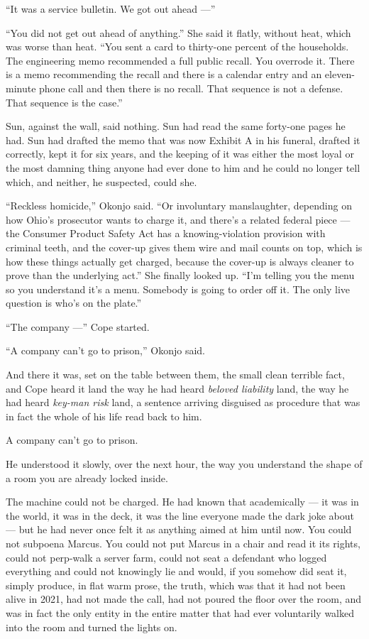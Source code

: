 \documentclass[11pt,openany]{book}
\newcommand{\scenebreak}{\par\vspace{0.5\baselineskip}\begin{center}\textasteriskcentered\quad\textasteriskcentered\quad\textasteriskcentered\end{center}\vspace{0.5\baselineskip}\par}
\begin{document}
``It was a service bulletin. We got out ahead ---''

``You did not get out ahead of anything.'' She said it flatly, without heat, which was worse than heat. ``You sent a card to thirty-one percent of the households. The engineering memo recommended a full public recall. You overrode it. There is a memo recommending the recall and there is a calendar entry and an eleven-minute phone call and then there is no recall. That sequence is not a defense. That sequence is the case.''

Sun, against the wall, said nothing. Sun had read the same forty-one pages he had. Sun had drafted the memo that was now Exhibit A in his funeral, drafted it correctly, kept it for six years, and the keeping of it was either the most loyal or the most damning thing anyone had ever done to him and he could no longer tell which, and neither, he suspected, could she.

``Reckless homicide,'' Okonjo said. ``Or involuntary manslaughter, depending on how Ohio's prosecutor wants to charge it, and there's a related federal piece --- the Consumer Product Safety Act has a knowing-violation provision with criminal teeth, and the cover-up gives them wire and mail counts on top, which is how these things actually get charged, because the cover-up is always cleaner to prove than the underlying act.'' She finally looked up. ``I'm telling you the menu so you understand it's a menu. Somebody is going to order off it. The only live question is who's on the plate.''

``The company ---'' Cope started.

``A company can't go to prison,'' Okonjo said.

And there it was, set on the table between them, the small clean terrible fact, and Cope heard it land the way he had heard \textit{beloved liability} land, the way he had heard \textit{key-man risk} land, a sentence arriving disguised as procedure that was in fact the whole of his life read back to him.

A company can't go to prison.


\scenebreak


He understood it slowly, over the next hour, the way you understand the shape of a room you are already locked inside.

The machine could not be charged. He had known that academically --- it was in the world, it was in the deck, it was the line everyone made the dark joke about --- but he had never once felt it as anything aimed at him until now. You could not subpoena Marcus. You could not put Marcus in a chair and read it its rights, could not perp-walk a server farm, could not seat a defendant who logged everything and could not knowingly lie and would, if you somehow did seat it, simply produce, in flat warm prose, the truth, which was that it had not been alive in 2021, had not made the call, had not poured the floor over the room, and was in fact the only entity in the entire matter that had ever voluntarily walked into the room and turned the lights on.
\end{document}

